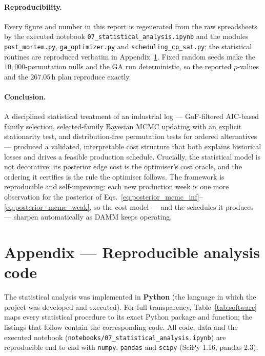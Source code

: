 \documentclass[11pt,a4paper]{article}
\begin{document}
\paragraph{Reproducibility.}
Every figure and number in this report is regenerated from the raw spreadsheets by
the executed notebook \texttt{07\_statistical\_analysis.ipynb} and the modules
\texttt{post\_mortem.py}, \texttt{ga\_optimizer.py} and
\texttt{scheduling\_cp\_sat.py}; the statistical routines are reproduced verbatim
in Appendix~\ref{sec:appendix}. Fixed random seeds make the $10{,}000$-permutation
nulls and the GA run deterministic, so the reported $p$-values and the $267.05$\,h
plan reproduce exactly.

\paragraph{Conclusion.}
A disciplined statistical treatment of an industrial log --- GoF-filtered
AIC-based family selection, selected-family Bayesian MCMC updating with an
explicit stationarity test, and distribution-free permutation tests for ordered alternatives ---
produced a validated, interpretable cost structure that both explains historical
losses and drives a feasible production schedule. Crucially, the statistical model
is not decorative: its posterior edge cost is the optimiser's cost oracle, and the
ordering it certifies is the rule the optimiser follows. The framework is
reproducible and self-improving: each new production week is one more observation
for the posterior of Eqs.~\eqref{eq:posterior_mcmc_inf}--\eqref{eq:posterior_mcmc_weak}, so the cost model --- and the
schedules it produces --- sharpen automatically as DAMM keeps operating.




\appendix
\section{Appendix --- Reproducible analysis code}\label{sec:appendix}
The statistical analysis was implemented in \textbf{Python} (the language in which
the project was developed and executed). For full transparency,
Table~\ref{tab:software} maps every statistical procedure to its exact Python
package and function; the listings that follow contain the corresponding code. All
code, data and the executed notebook
(\texttt{notebooks/07\_statistical\_analysis.ipynb}) are reproducible end to end
with \texttt{numpy}, \texttt{pandas} \cite{mckinney2010pandas} and \texttt{scipy}
\cite{virtanen2020scipy} (SciPy 1.16, pandas 2.3).
\end{document}
